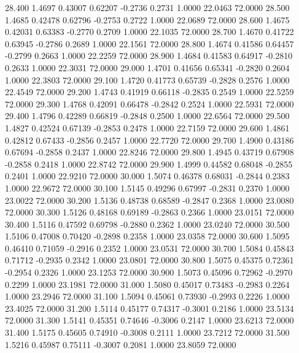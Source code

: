   28.400   1.4697   0.43007   0.62207  -0.2736   0.2731   1.0000  22.0463  72.0000
  28.500   1.4685   0.42478   0.62796  -0.2753   0.2722   1.0000  22.0689  72.0000
  28.600   1.4675   0.42031   0.63383  -0.2770   0.2709   1.0000  22.1035  72.0000
  28.700   1.4670   0.41722   0.63945  -0.2786   0.2689   1.0000  22.1561  72.0000
  28.800   1.4674   0.41586   0.64457  -0.2799   0.2663   1.0000  22.2259  72.0000
  28.900   1.4684   0.41583   0.64917  -0.2810   0.2633   1.0000  22.3031  72.0000
  29.000   1.4701   0.41656   0.65341  -0.2820   0.2604   1.0000  22.3803  72.0000
  29.100   1.4720   0.41773   0.65739  -0.2828   0.2576   1.0000  22.4549  72.0000
  29.200   1.4743   0.41919   0.66118  -0.2835   0.2549   1.0000  22.5259  72.0000
  29.300   1.4768   0.42091   0.66478  -0.2842   0.2524   1.0000  22.5931  72.0000
  29.400   1.4796   0.42289   0.66819  -0.2848   0.2500   1.0000  22.6564  72.0000
  29.500   1.4827   0.42524   0.67139  -0.2853   0.2478   1.0000  22.7159  72.0000
  29.600   1.4861   0.42812   0.67433  -0.2856   0.2457   1.0000  22.7720  72.0000
  29.700   1.4900   0.43186   0.67694  -0.2858   0.2437   1.0000  22.8246  72.0000
  29.800   1.4945   0.43719   0.67908  -0.2858   0.2418   1.0000  22.8742  72.0000
  29.900   1.4999   0.44582   0.68048  -0.2855   0.2401   1.0000  22.9210  72.0000
  30.000   1.5074   0.46378   0.68031  -0.2844   0.2383   1.0000  22.9672  72.0000
  30.100   1.5145   0.49296   0.67997  -0.2831   0.2370   1.0000  23.0022  72.0000
  30.200   1.5136   0.48738   0.68589  -0.2847   0.2368   1.0000  23.0080  72.0000
  30.300   1.5126   0.48168   0.69189  -0.2863   0.2366   1.0000  23.0151  72.0000
  30.400   1.5116   0.47592   0.69798  -0.2880   0.2362   1.0000  23.0240  72.0000
  30.500   1.5106   0.47008   0.70420  -0.2898   0.2358   1.0000  23.0358  72.0000
  30.600   1.5095   0.46410   0.71059  -0.2916   0.2352   1.0000  23.0531  72.0000
  30.700   1.5084   0.45843   0.71712  -0.2935   0.2342   1.0000  23.0801  72.0000
  30.800   1.5075   0.45375   0.72361  -0.2954   0.2326   1.0000  23.1253  72.0000
  30.900   1.5073   0.45096   0.72962  -0.2970   0.2299   1.0000  23.1981  72.0000
  31.000   1.5080   0.45017   0.73483  -0.2983   0.2264   1.0000  23.2946  72.0000
  31.100   1.5094   0.45061   0.73930  -0.2993   0.2226   1.0000  23.4025  72.0000
  31.200   1.5114   0.45177   0.74317  -0.3001   0.2186   1.0000  23.5134  72.0000
  31.300   1.5141   0.45351   0.74646  -0.3006   0.2147   1.0000  23.6213  72.0000
  31.400   1.5175   0.45605   0.74910  -0.3008   0.2111   1.0000  23.7212  72.0000
  31.500   1.5216   0.45987   0.75111  -0.3007   0.2081   1.0000  23.8059  72.0000

